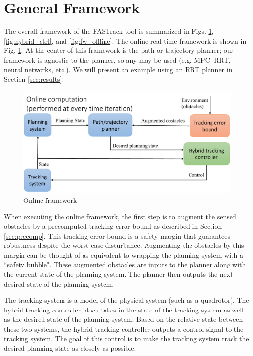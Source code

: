 \section{General Framework \label{sec:framework}}
The overall framework of the FASTrack tool is summarized in Figs. \ref{fig:fw_online}, \ref{fig:hybrid_ctrl}, and \ref{fig:fw_offline}. The online real-time framework is shown in Fig. \ref{fig:fw_online}. At the center of this framework is the path or trajectory planner; our framework is agnostic to the planner, so any may be used (e.g. MPC, RRT, neural networks, etc.). We will present an example using an RRT planner in Section \ref{sec:results}.
\begin{figure}[h!]
	\includegraphics[width=\columnwidth]{fig/framework_online}
	\caption{Online framework}
	\label{fig:fw_online}
	\vspace{-.1in}
\end{figure}

When executing the online framework, the first step is to augment the sensed obstacles by a precomputed tracking error bound as described in Section \ref{sec:precomp}. This tracking error bound is a safety margin that guarantees robustness despite the worst-case disturbance. Augmenting the obstacles by this margin can be thought of as equivalent to wrapping the planning system with a ``safety bubble". These augmented obstacles are inputs to the planner along with the current state of the planning system. The planner then outputs the next desired state of the planning system. 

The tracking system is a model of the physical system (such as a quadrotor). The hybrid tracking controller block takes in the state of the tracking system as well as the desired state of the planning system. Based on the relative state between these two systems, the hybrid tracking controller outputs a control signal to the tracking system. The goal of this control is to make the tracking system track the desired planning state as closely as possible.

